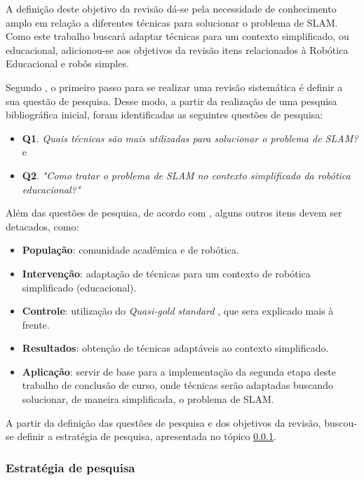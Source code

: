 		A definição deste objetivo da revisão dá-se pela necessidade de conhecimento amplo em relação a diferentes técnicas para solucionar o problema de SLAM. Como este trabalho buscará adaptar técnicas para um contexto simplificado, ou educacional, adicionou-se aos objetivos da revisão itens relacionados à Robótica Educacional e robôs simples.

		Segundo \cite{Kitchenham}, o primeiro passo para se realizar uma revisão sistemática é definir a sua questão de pesquisa. Desse modo, a partir da realização de uma pesquisa bibliográfica inicial, foram identificadas as seguintes questões de pesquisa:

		\begin{itemize}
			\item \textbf{Q1}. \textit{Quais técnicas são mais utilizadas para solucionar o problema de SLAM?} e
			\item \textbf{Q2}. \textit{"Como tratar o problema de SLAM no contexto simplificado da robótica educacional?"}
		\end{itemize}

		Além das questões de pesquisa, de acordo com \cite{exemploRevisaoSistematica}, alguns outros itens devem ser detacados, como:

		\begin{itemize}
			\item \textbf{População}: comunidade acadêmica e de robótica.
			\item \textbf{Intervenção}: adaptação de técnicas para um contexto de robótica simplificado (educacional).
			\item \textbf{Controle}: utilização do \textit{Quasi-gold standard} \cite{Kitchenham}, que sera explicado mais à frente.
			\item \textbf{Resultados}: obtenção de técnicas adaptáveis ao contexto simplificado.
			\item \textbf{Aplicação}: servir de base para a implementação da segunda etapa deste trabalho de conclusão de curso, onde técnicas serão adaptadas buscando solucionar, de maneira simplificada, o problema de SLAM.

		\end{itemize}

		A partir da definição das questões de pesquisa e dos objetivos da revisão, buscou-se definir a estratégia de pesquisa, apresentada no tópico \ref{sub:estrategias_pesquisa}.

		\subsubsection{Estratégia de pesquisa}
		\label{sub:estrategias_pesquisa}

